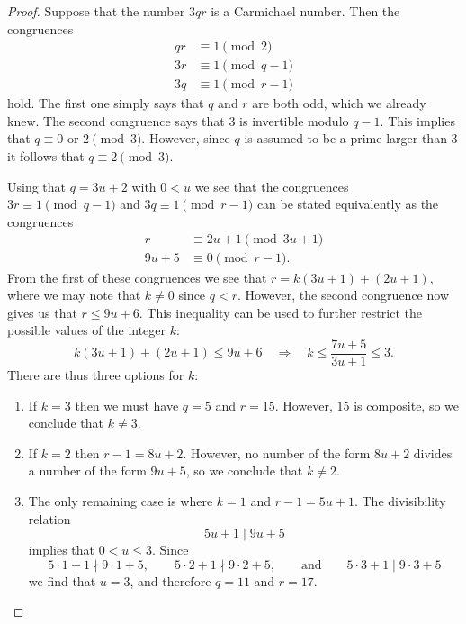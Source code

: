 \begin{proof}
  Suppose that the number $3qr$ is a Carmichael number. Then the congruences
  \begin{align*}
    qr & \equiv 1\pmod{2} \\
    3r & \equiv 1\pmod{q-1} \\
    3q & \equiv 1\pmod{r-1}
  \end{align*}
  hold. The first one simply says that $q$ and $r$ are both odd, which we already knew. The second congruence says that $3$ is invertible modulo $q-1$. This implies that $q\equiv 0$ or $2\pmod{3}$. However, since $q$ is assumed to be a prime larger than $3$ it follows that $q\equiv 2\pmod{3}$.

  Using that $q=3u+2$ with $0<u$ we see that the congruences $3r\equiv 1\pmod{q-1}$ and $3q\equiv 1\pmod{r-1}$ can be stated equivalently as the congruences
  \begin{align*}
    r & \equiv 2u+1\pmod{3u+1} \\
    9u+5 & \equiv 0\pmod{r-1}.
  \end{align*}
  From the first of these congruences we see that $r=k(3u+1)+(2u+1)$, where we may note that $k\neq 0$ since $q<r$. However, the second congruence now gives us that $r\leq 9u+6$. This inequality can be used to further restrict the possible values of the integer $k$:
  \begin{equation*}
    k(3u+1)+(2u+1)\leq 9u+6\quad\Rightarrow\quad
    k \leq \frac{7u+5}{3u+1}\leq 3.
  \end{equation*}
  There are thus three options for $k$:
  \begin{enumerate}
  \item If $k=3$ then we must have $q=5$ and $r=15$. However, $15$ is composite, so we conclude that $k\neq 3$.
  \item If $k=2$ then $r-1=8u+2$. However, no number of the form $8u+2$ divides a number of the form $9u+5$, so we conclude that $k\neq 2$.
  \item The only remaining case is where $k=1$ and $r-1=5u+1$. The divisibility relation
    \begin{equation*}
      5u+1\mid 9u+5
    \end{equation*}
    implies that $0<u\leq 3$. Since
    \begin{equation*}
      5\cdot 1 + 1\nmid 9\cdot 1+5,\qquad 5\cdot 2+1 \nmid 9\cdot 2+5,\qquad\text{and}\qquad 5\cdot 3+1\mid 9\cdot 3+5
    \end{equation*}
    we find that $u=3$, and therefore $q=11$ and $r=17$.\qedhere
  \end{enumerate}
\end{proof}

